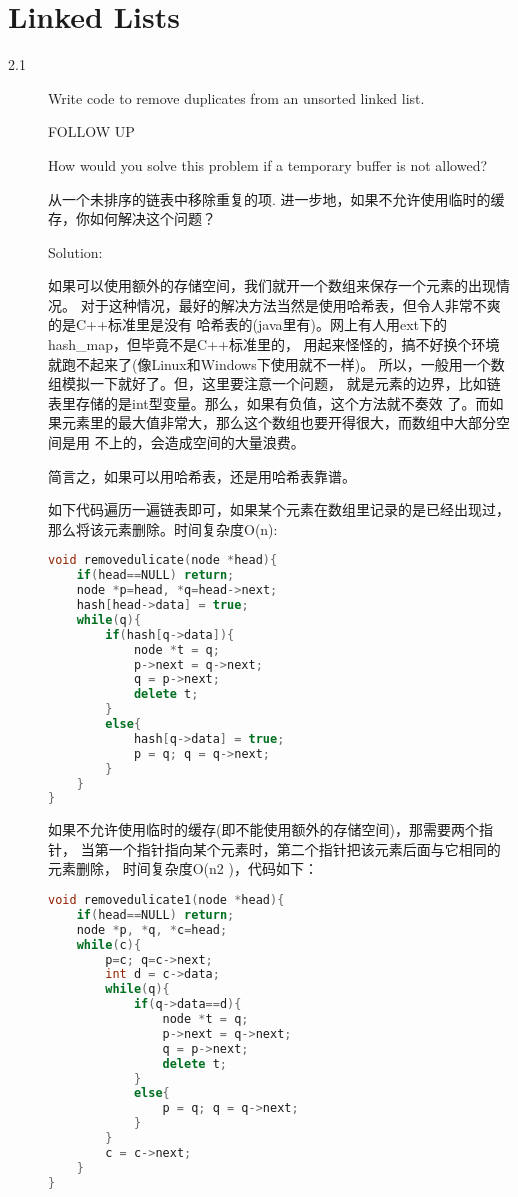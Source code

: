 \chapter{Linked Lists}
\small{}

\begin{description}
\item[2.1] Write code to remove duplicates from an unsorted linked list.

FOLLOW UP

How would you solve this problem if a temporary buffer is not allowed?

从一个未排序的链表中移除重复的项. 进一步地，如果不允许使用临时的缓存，你如何解决这个问题？

Solution: 

如果可以使用额外的存储空间，我们就开一个数组来保存一个元素的出现情况。 对于这种情况，最好的解决方法当然是使用哈希表，但令人非常不爽的是C++标准里是没有 哈希表的(java里有)。网上有人用ext下的hash\_map，但毕竟不是C++标准里的， 用起来怪怪的，搞不好换个环境就跑不起来了(像Linux和Windows下使用就不一样)。 所以，一般用一个数组模拟一下就好了。但，这里要注意一个问题， 就是元素的边界，比如链表里存储的是int型变量。那么，如果有负值，这个方法就不奏效 了。而如果元素里的最大值非常大，那么这个数组也要开得很大，而数组中大部分空间是用 不上的，会造成空间的大量浪费。

简言之，如果可以用哈希表，还是用哈希表靠谱。

如下代码遍历一遍链表即可，如果某个元素在数组里记录的是已经出现过， 那么将该元素删除。时间复杂度O(n):
\begin{lstlisting}[language=C++]
void removedulicate(node *head){
    if(head==NULL) return;
    node *p=head, *q=head->next;
    hash[head->data] = true;
    while(q){
        if(hash[q->data]){
            node *t = q;
            p->next = q->next;
            q = p->next;
            delete t;
        }
        else{
            hash[q->data] = true;
            p = q; q = q->next;
        }
    }
}
\end{lstlisting}

如果不允许使用临时的缓存(即不能使用额外的存储空间)，那需要两个指针， 当第一个指针指向某个元素时，第二个指针把该元素后面与它相同的元素删除， 时间复杂度O(n2 )，代码如下：
\begin{lstlisting}[language=C++]
void removedulicate1(node *head){
    if(head==NULL) return;
    node *p, *q, *c=head;
    while(c){
        p=c; q=c->next;
        int d = c->data;
        while(q){
            if(q->data==d){
                node *t = q;
                p->next = q->next;
                q = p->next;
                delete t;
            }
            else{
                p = q; q = q->next;
            }
        }
        c = c->next;
    }
}
\end{lstlisting}


\end{description}
